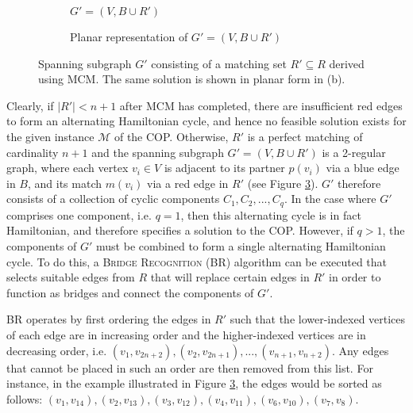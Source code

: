 \documentclass[oribibl]{llncs}
\begin{document}
\begin{figure}	
	\centering
	\begin{subfigure}[t]{0.4\textwidth}
		
		\caption{$G' = (V, B \cup R')$}	
		\label{fig:matching}
	\end{subfigure} \quad
	\begin{subfigure}[t]{0.57\textwidth}
		
		\caption{Planar representation of $G' =(V, B \cup R')$}	
		\label{fig:mps}
	\end{subfigure}
	\caption{Spanning subgraph $G'$ consisting of a matching set $R' \subseteq R$ derived using MCM. The same solution is shown in planar form in (b).}
	\label{fig:matching/mps}
\end{figure}

Clearly, if $|R'| < n+1$ after MCM has completed, there are insufficient red edges to form an alternating Hamiltonian cycle, and hence no feasible solution exists for the given instance $\mathcal{M}$ of the COP. Otherwise, $R'$ is a perfect matching of cardinality $n+1$ and the spanning subgraph $G'=(V, B \cup R')$ is a 2-regular graph, where each vertex $v_i \in V$ is adjacent to its partner $p(v_i)$ via a blue edge in $B$, and its match $m(v_i)$ via a red edge in $R'$ (see Figure \ref{fig:matching/mps}). $G'$ therefore consists of a collection of cyclic components $C_1, C_2, ..., C_q$. In the case where $G'$ comprises one component, i.e. $q = 1$, then this alternating cycle is in fact Hamiltonian, and therefore specifies a solution to the COP. However, if $q > 1$, the components of $G'$ must be combined to form a single alternating Hamiltonian cycle. To do this, a \textsc{Bridge Recognition} (BR) algorithm can be executed that selects suitable edges from $R$ that will replace certain edges in $R'$ in order to function as bridges and connect the components of $G'$.

BR operates by first ordering the edges in $R'$ such that the lower-indexed vertices of each edge are in increasing order and the higher-indexed vertices are in decreasing order, i.e. $(v_1, v_{2n+2}), (v_2, v_{2n+1}), ..., (v_{n+1}, v_{n+2})$. Any edges that cannot be placed in such an order are then removed from this list. For instance, in the example illustrated in Figure \ref{fig:matching/mps}, the edges would be sorted as follows: $(v_1, v_{14}), (v_2, v_{13}),(v_3, v_{12}),(v_4, v_{11}),(v_6, v_{10}),(v_7, v_8)$.
\end{document}
